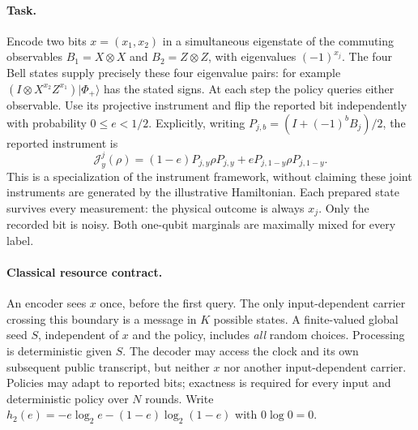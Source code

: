 \documentclass[11pt,a4paper]{article}
\theoremstyle{definition}
\newcommand{\ket}[1]{|#1\rangle}
\begin{document}
\paragraph{Task.} Encode two bits $x=(x_1,x_2)$ in a simultaneous eigenstate of the commuting observables $B_1=X\otimes X$ and $B_2=Z\otimes Z$, with eigenvalues $(-1)^{x_j}$. The four Bell states supply precisely these four eigenvalue pairs: for example $(I\otimes X^{x_2}Z^{x_1})\ket{\Phi_+}$ has the stated signs. At each step the policy queries either observable. Use its projective instrument and flip the reported bit independently with probability $0\le e<1/2$. Explicitly, writing $P_{j,b}=(I+(-1)^b B_j)/2$, the reported instrument is
\[
 \mathcal J^j_y(\rho)=(1-e)P_{j,y}\rho P_{j,y}
                  + e P_{j,1-y}\rho P_{j,1-y}.
\]
This is a specialization of the instrument framework, without claiming these joint instruments are generated by the illustrative Hamiltonian. Each prepared state survives every measurement: the physical outcome is always $x_j$. Only the recorded bit is noisy. Both one-qubit marginals are maximally mixed for every label.

\paragraph{Classical resource contract.} An encoder sees $x$ once, before the first query. The only input-dependent carrier crossing this boundary is a message in $K$ possible states. A finite-valued global seed $S$, independent of $x$ and the policy, includes \emph{all} random choices. Processing is deterministic given $S$. The decoder may access the clock and its own subsequent public transcript, but neither $x$ nor another input-dependent carrier. Policies may adapt to reported bits; exactness is required for every input and deterministic policy over $N$ rounds. Write $h_2(e)=-e\log_2 e-(1-e)\log_2(1-e)$ with $0\log 0=0$.
\end{document}
